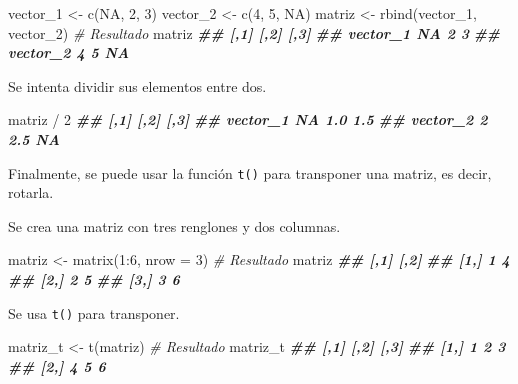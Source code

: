 \documentclass[
]{book}
\newenvironment{Shaded}{\begin{snugshade}}{\end{snugshade}}
\newcommand{\AttributeTok}[1]{\textcolor[rgb]{0.77,0.63,0.00}{#1}}
\newcommand{\CommentTok}[1]{\textcolor[rgb]{0.56,0.35,0.01}{\textit{#1}}}
\newcommand{\ConstantTok}[1]{\textcolor[rgb]{0.00,0.00,0.00}{#1}}
\newcommand{\DecValTok}[1]{\textcolor[rgb]{0.00,0.00,0.81}{#1}}
\newcommand{\DocumentationTok}[1]{\textcolor[rgb]{0.56,0.35,0.01}{\textbf{\textit{#1}}}}
\newcommand{\FunctionTok}[1]{\textcolor[rgb]{0.00,0.00,0.00}{#1}}
\newcommand{\NormalTok}[1]{#1}
\newcommand{\OtherTok}[1]{\textcolor[rgb]{0.56,0.35,0.01}{#1}}
\newcommand{\SpecialCharTok}[1]{\textcolor[rgb]{0.00,0.00,0.00}{#1}}
\begin{document}
\begin{Shaded}
\begin{Highlighting}[]
\NormalTok{vector\_1 }\OtherTok{\textless{}{-}} \FunctionTok{c}\NormalTok{(}\ConstantTok{NA}\NormalTok{, }\DecValTok{2}\NormalTok{, }\DecValTok{3}\NormalTok{)}
\NormalTok{vector\_2 }\OtherTok{\textless{}{-}} \FunctionTok{c}\NormalTok{(}\DecValTok{4}\NormalTok{, }\DecValTok{5}\NormalTok{, }\ConstantTok{NA}\NormalTok{)}
\NormalTok{matriz }\OtherTok{\textless{}{-}} \FunctionTok{rbind}\NormalTok{(vector\_1, vector\_2)}
\CommentTok{\# Resultado}
\NormalTok{matriz}
\DocumentationTok{\#\#          [,1] [,2] [,3]}
\DocumentationTok{\#\# vector\_1   NA    2    3}
\DocumentationTok{\#\# vector\_2    4    5   NA}
\end{Highlighting}
\end{Shaded}

Se intenta dividir sus elementos entre dos.

\begin{Shaded}
\begin{Highlighting}[]
\NormalTok{matriz }\SpecialCharTok{/} \DecValTok{2}
\DocumentationTok{\#\#          [,1] [,2] [,3]}
\DocumentationTok{\#\# vector\_1   NA  1.0  1.5}
\DocumentationTok{\#\# vector\_2    2  2.5   NA}
\end{Highlighting}
\end{Shaded}

Finalmente, se puede usar la función \texttt{t()} para transponer una matriz, es decir, rotarla.

Se crea una matriz con tres renglones y dos columnas.

\begin{Shaded}
\begin{Highlighting}[]
\NormalTok{matriz }\OtherTok{\textless{}{-}} \FunctionTok{matrix}\NormalTok{(}\DecValTok{1}\SpecialCharTok{:}\DecValTok{6}\NormalTok{, }\AttributeTok{nrow =} \DecValTok{3}\NormalTok{)}
\CommentTok{\# Resultado}
\NormalTok{matriz}
\DocumentationTok{\#\#      [,1] [,2]}
\DocumentationTok{\#\# [1,]    1    4}
\DocumentationTok{\#\# [2,]    2    5}
\DocumentationTok{\#\# [3,]    3    6}
\end{Highlighting}
\end{Shaded}

Se usa \texttt{t()} para transponer.

\begin{Shaded}
\begin{Highlighting}[]
\NormalTok{matriz\_t }\OtherTok{\textless{}{-}} \FunctionTok{t}\NormalTok{(matriz)}
\CommentTok{\# Resultado}
\NormalTok{matriz\_t}
\DocumentationTok{\#\#      [,1] [,2] [,3]}
\DocumentationTok{\#\# [1,]    1    2    3}
\DocumentationTok{\#\# [2,]    4    5    6}
\end{Highlighting}
\end{Shaded}
\end{document}
